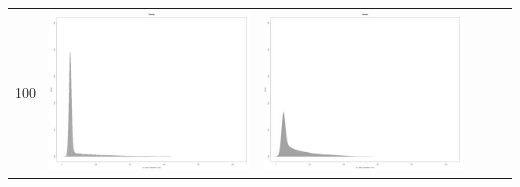 \begin{table}[htbp]
{\begin{tabular}{l | ccccc}
		100	   & \begin{minipage}{.15\textwidth}\vspace{2pt}     							
     			 	\includegraphics[width=\linewidth]{images/mema-dens-graph/I3}
    				 \end{minipage}
    			   & \begin{minipage}{.15\textwidth}\vspace{2pt}     							
     			 	\includegraphics[width=\linewidth]{images/mema-dens-graph/I7}
    				 \end{minipage}
    			   &	 \begin{minipage}{.15\textwidth}\vspace{2pt}     							

\end{minipage}
\end{tabular}}
\end{table}
